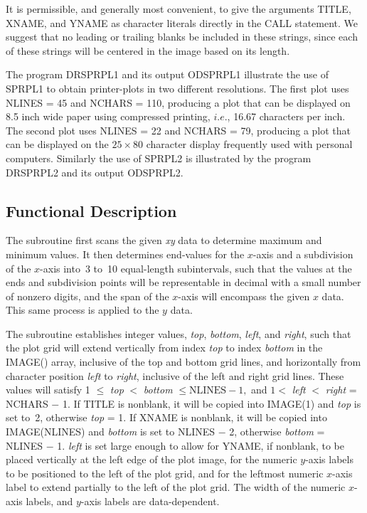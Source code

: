 \documentclass[twoside]{MATH77}
\begin{document}
It is permissible, and generally most convenient, to give the arguments
TITLE, XNAME, and YNAME as character literals directly in the CALL
statement. We suggest that no leading or trailing blanks be included in
these strings, since each of these strings will be centered in the image
based on its length.

The program DRSPRPL1 and its output ODSPRPL1 illustrate the use of SPRPL1 to
obtain printer-plots in two different resolutions. The first plot uses
NLINES = 45 and NCHARS = 110, producing a plot that can be displayed on
8.5 inch wide paper using compressed printing, $i.e.$, 16.67 characters per
inch. The second plot uses NLINES = 22 and NCHARS = 79, producing a plot
that can be displayed on the $25 \times 80$ character display frequently
used with personal computers. Similarly the use of SPRPL2 is illustrated by
the program DRSPRPL2 and its output ODSPRPL2.

\subsection{Functional Description}

The subroutine first scans the given {\em xy} data to determine maximum and
minimum values. It then determines end-values for the $x$-axis and a
subdivision of the $x$-axis into~3 to~10 equal-length subintervals, such
that the values at the ends and subdivision points will be representable in
decimal with a small number of nonzero digits, and the span of the $x$-axis
will encompass the given $x$ data. This same process is applied to the $y$
data.

The subroutine establishes integer values, {\em top}, {\em bottom},
{\em left}, and {\em right}, such that the plot grid will extend vertically
from index {\em top} to index {\em bottom} in the IMAGE() array, inclusive
of the top and bottom grid lines, and horizontally from character position
{\em left} to {\em right}, inclusive of the left and right grid lines. These
values will satisfy 1 $\leq$ {\em top} $<$ {\em bottom} $\leq  \text{NLINES}
- 1,$ and $1 <$ {\em left} $<$ {\em right} = NCHARS $-$ 1.  If TITLE is
nonblank, it will be copied into IMAGE(1) and {\em top} is set to~2,
otherwise {\em top} = 1. If XNAME is nonblank, it will be copied into
IMAGE(NLINES) and {\em bottom} is set to NLINES $-$ 2, otherwise {\em bottom}
= NLINES $-$ 1. {\em left} is set large enough to allow for YNAME, if
nonblank, to be placed vertically at the left edge of the plot image, for
the numeric $y$-axis labels to be positioned to the left of the plot grid,
and for the leftmost numeric $x$-axis label to extend partially to the left
of the plot grid. The width of the numeric $x$-axis labels, and $y$-axis
labels are data-dependent.
\end{document}
